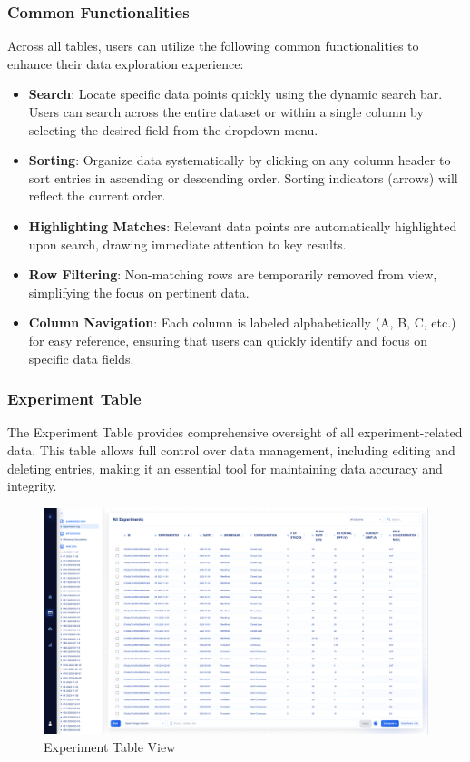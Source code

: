\documentclass[12pt]{article}
\begin{document}
\subsubsection{Common Functionalities}
Across all tables, users can utilize the following common functionalities to
enhance their data exploration experience:
\begin{itemize}
    \item \textbf{Search}: Locate specific data points quickly using the dynamic
    search bar. Users can search across the entire dataset or within a single
    column by selecting the desired field from the dropdown menu.
    \item \textbf{Sorting}: Organize data systematically by clicking on any
    column header to sort entries in ascending or descending order. Sorting
    indicators (arrows) will reflect the current order.
    \item \textbf{Highlighting Matches}: Relevant data points are automatically
    highlighted upon search, drawing immediate attention to key results.
    \item \textbf{Row Filtering}: Non-matching rows are temporarily removed from
    view, simplifying the focus on pertinent data.
    \item \textbf{Column Navigation}: Each column is labeled alphabetically (A,
    B, C, etc.) for easy reference, ensuring that users can quickly identify and
    focus on specific data fields.
\end{itemize}

\subsubsection{Experiment Table}
The Experiment Table  provides comprehensive oversight of all experiment-related
data. This table allows full control over data management, including editing and
deleting entries, making it an essential tool for maintaining data accuracy and
integrity.

\begin{figure}[H]
    \centering
    \includegraphics[width=1\textwidth]{./Diagrams/ExperimentTableView.png}
    \caption{Experiment Table View}
\end{figure}
\end{document}
